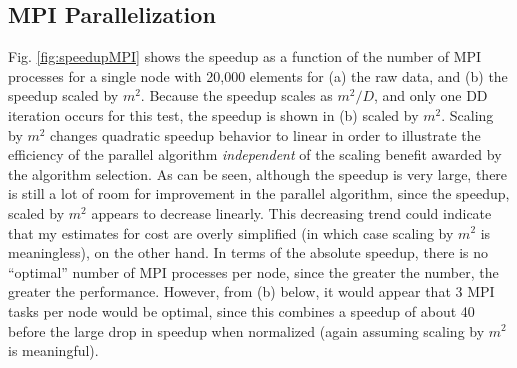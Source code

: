 \documentclass[10pt]{article}
\begin{document}
\subsection{MPI Parallelization}

Fig. \ref{fig:speedupMPI} shows the speedup as a function of the number of MPI processes for a single node with 20,000 elements for (a) the raw data, and (b) the speedup scaled by \(m^2\). Because the speedup scales as \(m^2/D\), and only one DD iteration occurs for this test, the speedup is shown in (b) scaled by \(m^2\). Scaling by \(m^2\) changes quadratic speedup behavior to linear in order to illustrate the efficiency of the parallel algorithm {\it independent} of the scaling benefit awarded by the algorithm selection. As can be seen, although the speedup is very large, there is still a lot of room for improvement in the parallel algorithm, since the speedup, scaled by \(m^2\) appears to decrease linearly. This decreasing trend could indicate that my estimates for cost are overly simplified (in which case scaling by \(m^2\) is meaningless), on the other hand. In terms of the absolute speedup, there is no ``optimal'' number of MPI processes per node, since the greater the number, the greater the performance. However, from (b) below, it would appear that 3 MPI tasks per node would be optimal, since this combines a speedup of about 40 before the large drop in speedup when normalized (again assuming scaling by \(m^2\) is meaningful). 
\end{document}
